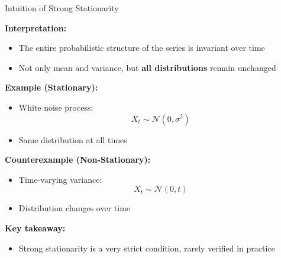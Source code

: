 \documentclass[aspectratio=169]{beamer}
\begin{document}
\begin{frame}{Intuition of Strong Stationarity}

\textbf{Interpretation:}
\begin{itemize}
    \item The entire probabilistic structure of the series is invariant over time
    \item Not only mean and variance, but \textbf{all distributions} remain unchanged
\end{itemize}

\vspace{0.4cm}

\textbf{Example (Stationary):}
\begin{itemize}
    \item White noise process:
    \[
    X_t \sim \mathcal{N}(0, \sigma^2)
    \]
    \item Same distribution at all times
\end{itemize}

\vspace{0.4cm}

\textbf{Counterexample (Non-Stationary):}
\begin{itemize}
    \item Time-varying variance:
    \[
    X_t \sim \mathcal{N}(0, t)
    \]
    \item Distribution changes over time
\end{itemize}

\vspace{0.4cm}

\textbf{Key takeaway:}
\begin{itemize}
    \item Strong stationarity is a very strict condition, rarely verified in practice
\end{itemize}

\end{frame}
\end{document}
